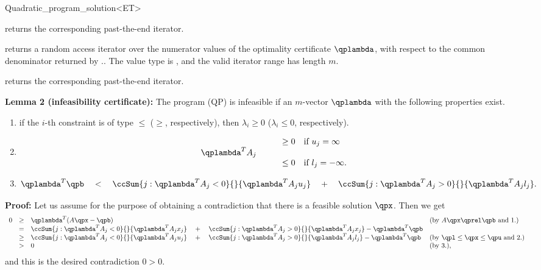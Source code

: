 \begin{ccRefClass}{Quadratic_program_solution<ET>}
\begin{ccAdvanced}
{returns the corresponding past-the-end iterator.}

{returns a random access iterator over the numerator values
of the optimality certificate $\qplambda$, with respect to the
common denominator returned by \ccVar.. 
The value type is , and the valid iterator range has length $m$.}

{returns the corresponding past-the-end iterator.}

\ccExample
{}

{\bf Lemma 2 (infeasibility certificate):} The program (QP) is
infeasible if an $m$-vector $\qplambda$ with the
following properties exist.
\begin{enumerate}
\item if the $i$-th constraint is of type $\leq$ ($\geq$, respectively), 
then $\lambda_i\geq 0$ ($\lambda_i\leq 0$, respectively).
\item 
\[
\begin{array}{llll}
&&\geq 0 & \mbox{if $u_j=\infty$} \\
\qplambda^T A_j &\quad  \\
&&\leq 0 & \mbox{if $l_j=-\infty$.}
\end{array}
\]
\item \[\qplambda^T\qpb \quad<\quad \ccSum{j: \qplambda^TA_j <0}{}{ \qplambda^TA_j u_j }
\quad+\quad  \ccSum{j: \qplambda^TA_j >0}{}{ \qplambda^TA_j l_j}.\]
\end{enumerate}

{\bf Proof:} Let us assume for the purpose of obtaining a contradiction
that there is a feasible solution $\qpx$. Then we get
\[
\begin{array}{lcll}
0 &\geq& \qplambda^T(A\qpx -\qpb) &  \mbox{(by $A\qpx\qprel \qpb$ and 1.)} \\
  &=& \ccSum{j: \qplambda^TA_j <0}{}{ \qplambda^TA_j x_j }
\quad+\quad  \ccSum{j: \qplambda^TA_j >0}{}{ \qplambda^TA_j x_j} - \qplambda^T \qpb \\
  &\geq& \ccSum{j: \qplambda^TA_j <0}{}{ \qplambda^TA_j u_j }
\quad+\quad  \ccSum{j: \qplambda^TA_j >0}{}{ \qplambda^TA_j l_j} - \qplambda^T \qpb &
\mbox{(by $\qpl\leq \qpx \leq \qpu$ and 2.)} \\
  &>& 0 & \mbox{(by 3.)}, 
\end{array}
\]
and this is the desired contradiction $0>0$.



\end{ccAdvanced}
\end{ccRefClass}
